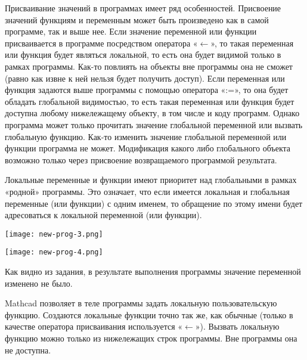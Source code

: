 Присваивание значений в программах имеет ряд особенностей. Присвоение значений функциям и переменным может быть произведено как в самой программе, так и выше нее. Если значение переменной или функции присваивается в программе посредством оператора «$\leftarrow$», то такая переменная или функция будет являться локальной, то есть она будет видимой только в рамках программы. Как-то повлиять на объекты вне программы она не сможет (равно как извне к ней нельзя будет получить доступ). Если переменная или функция задаются выше программы с помощью оператора «:=», то она будет обладать глобальной видимостью, то есть такая переменная или функция будет доступна любому нижележащему объекту, в том числе и коду программ. Однако программа может только прочитать значение глобальной переменной или вызвать глобальную функцию. Как-то изменить значение глобальной переменной или функции программа не может. Модификация какого либо глобального объекта возможно только через присвоение возвращаемого программой результата.

Локальные переменные и функции имеют приоритет над глобальными в рамках «родной» программы. Это означает, что если имеется локальная и глобальная переменные (или функции) с одним именем, то обращение по этому имени будет адресоваться к локальной переменной (или функции).


\begin{center}
	\texttt{[image: new-prog-3.png]}
\end{center}


\begin{center}
	\texttt{[image: new-prog-4.png]}
\end{center}

Как видно из задания, в результате выполнения программы значение переменной  изменено не было.

Mathcad позволяет в теле программы задать локальную пользовательскую функцию. Создаются локальные функции точно так же, как обычные (только в качестве оператора присваивания используется  «$\leftarrow$»). Вызвать локальную функцию можно только из нижележащих строк программы. Вне программы она не доступна.

